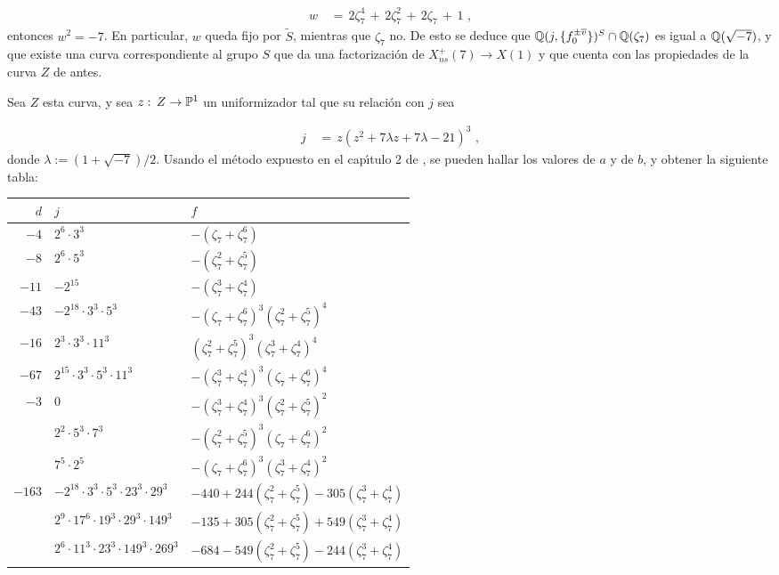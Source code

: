 \begin{align*}
w & \,=\,2\zeta_{7}^{4}\,+\,2\zeta_{7}^{2}\,+\,2\zeta_{7}\,+\,1\text{ ,}
\end{align*}
entonces $w^{2}=-7$. En particular, $w$ queda fijo por $\widetilde{S}$,
mientras que $\zeta_{7}$ no. De esto se deduce que
$\mathbb{Q}(j,\{f_{0}^{\pm\overline{v}}\})^{S}\cap\mathbb{Q}(\zeta_{7})$
es igual a $\mathbb{Q}(\sqrt{-7})$, y que existe una curva correspondiente al
grupo $S$ que da una factorizaci\'{o}n de $X_{ns}^{+}(7)\rightarrow X(1)$
y que cuenta con las propiedades de la curva $Z$ de antes.
\cite{kenkuLevelSeven}\cite{ligozat}

Sea $Z$ esta curva, y sea $z:\,Z\rightarrow\mathbb{P}^{1}$
un uniformizador tal que su relaci\'{o}n con $j$ sea

\begin{align*}
j & \,=\,z(z^{2}+7\lambda z+7\lambda -21)^{3}\text{ ,}
\end{align*}
donde $\lambda:=(1+\sqrt{-7})/2$.
Usando el m\'{e}todo expuesto en el cap\'{\i}tulo 2 de \cite{ligozat},
se pueden hallar los valores de $a$ y de $b$, y obtener la siguiente tabla:

\begin{tabular}[b]{r|l|l}
$d$ & $j$%
      & $f$\\
\hline
$-4$& $2^{6}\cdot 3^{3}$%
      & $-(\zeta_{7}+\zeta_{7}^{6})$\\
$-8$& $2^{6}\cdot 5^{3}$%
      & $-(\zeta_{7}^{2}+\zeta_{7}^{5})$\\
$-11$& $-2^{15}$%
      & $-(\zeta_{7}^{3}+\zeta_{7}^{4})$\\
$-43$& $-2^{18}\cdot 3^{3}\cdot 5^{3}$%
      & $-(\zeta_{7}+\zeta_{7}^{6})^{3}(\zeta_{7}^{2}+\zeta_{7}^{5})^{4}$\\
$-16$& $2^{3}\cdot 3^{3}\cdot 11^{3}$%
      & $(\zeta_{7}^{2}+\zeta_{7}^{5})^{3}(\zeta_{7}^{3}+\zeta_{7}^{4})^{4}$\\
$-67$& $2^{15}\cdot 3^{3}\cdot 5^{3}\cdot 11^{3}$%
      & $-(\zeta_{7}^{3}+\zeta_{7}^{4})^{3}(\zeta_{7}+\zeta_{7}^{6})^{4}$\\
$-3$& $0$%
      & $-(\zeta_{7}^{3}+\zeta_{7}^{4})^{3}(\zeta_{7}^{2}+\zeta_{7}^{5})^{2}$\\
\null& $2^{2}\cdot 5^{3}\cdot 7^{3}$%
      & $-(\zeta_{7}^{2}+\zeta_{7}^{5})^{3}(\zeta_{7}+\zeta_{7}^{6})^{2}$\\
\null& $7^{5}\cdot 2^{5}$%
      & $-(\zeta_{7}+\zeta_{7}^{6})^{3}(\zeta_{7}^{3}+\zeta_{7}^{4})^{2}$\\
$-163$& $-2^{18}\cdot 3^{3}\cdot 5^{3}\cdot 23^{3}\cdot 29^{3}$%
      & $-440+244(\zeta_{7}^{2}+\zeta_{7}^{5})-305(\zeta_{7}^{3}+\zeta_{7}^{4})$\\
\null& $2^{9}\cdot 17^{6}\cdot 19^{3}\cdot 29^{3}\cdot 149^{3}$%
      & $-135+305(\zeta_{7}^{2}+\zeta_{7}^{5})+549(\zeta_{7}^{3}+\zeta_{7}^{4})$\\
\null& $2^{6}\cdot 11^{3}\cdot 23^{3}\cdot 149^{3}\cdot 269^{3}$%
      & $-684-549(\zeta_{7}^{2}+\zeta_{7}^{5})-244(\zeta_{7}^{3}+\zeta_{7}^{4})$
\end{tabular}




